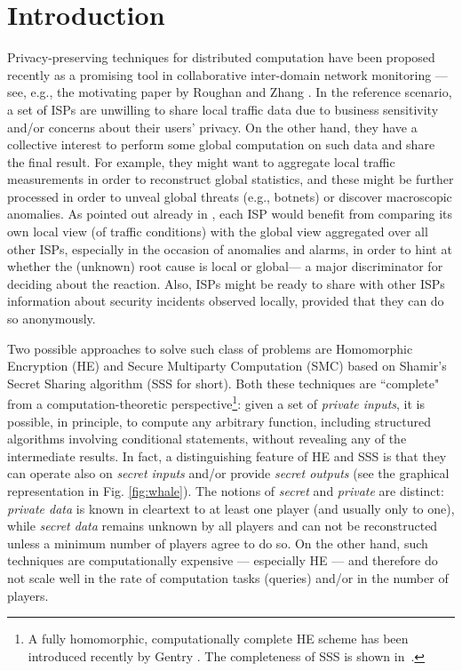\documentclass{sig-alternate}
\begin{document}
\newcommand{\ed}{\color{blue} xxx...}
\newcommand{\edd}{\color{red}}
\newcommand{\ata}{GCR }
\newcommand{\eqdef}{ \stackrel{\textrm{\tiny def}}{=}}


\section{Introduction}
Privacy-preserving techniques for distributed computation have been proposed recently as a promising tool in collaborative  inter-domain network monitoring --- see, e.g., the motivating paper by Roughan and Zhang \cite{RoughanCCR}. In the reference scenario, a set of ISPs are unwilling to share local traffic data due to business sensitivity and/or concerns about their users' privacy. On the other hand, they have a collective interest to perform some global computation on such data and share the final result. 
For example, they might want to aggregate local traffic measurements in order to reconstruct global statistics, and these might be further processed in order to unveal global threats (e.g., botnets) or discover macroscopic anomalies. 
As pointed out already in \cite{sepia10}, each ISP would benefit from comparing its own local view (of traffic conditions) with the global view aggregated over all other ISPs, especially in the occasion of anomalies and alarms, in order to hint at whether the (unknown) root cause is local or global--- a major discriminator for deciding about the reaction. Also, ISPs might be ready to share with other ISPs information about security incidents observed locally,  provided that they can do so anonymously.

Two possible approaches to solve such class of problems are Homomorphic Encryption (HE) and Secure Multiparty Computation (SMC) based on Shamir's Secret Sharing algorithm (SSS for short). 
Both these techniques are ``complete" from a computation-theoretic perspective\footnote{A fully homomorphic, computationally complete HE scheme has been introduced  recently by Gentry \cite{gentry2009fully}. The completeness of SSS is shown in~\cite{benor1988ctn}.}: given a set of {\em private inputs}, it is possible, in principle, to compute any arbitrary function, including structured algorithms involving conditional statements, without revealing any of the intermediate results.
In fact, a distinguishing feature of  HE and SSS is that they can operate also on {\em secret inputs} and/or provide {\em secret outputs} (see the graphical representation in Fig. \ref{fig:whale}).
The notions of {\em secret} and {\em private} are distinct: {\em private data} is known in cleartext to at least one player (and usually only to one), while {\em secret data} remains unknown by all players and can not be reconstructed unless a minimum number of players agree to do so. 
On the other hand, such techniques are computationally expensive --- especially HE --- and therefore do not scale well in the rate of computation tasks (queries) and/or in the number of players.
\end{document}
